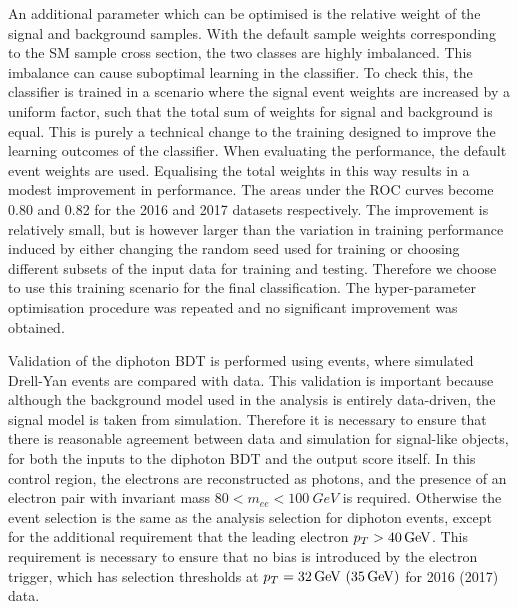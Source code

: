 An additional parameter which can be optimised is the relative weight 
of the signal and background samples.
With the default sample weights corresponding to the SM sample cross section, 
the two classes are highly imbalanced.
This imbalance can cause suboptimal learning in the classifier.
To check this, the classifier is trained in a scenario 
where the signal event weights are increased by a uniform factor, 
such that the total sum of weights for signal and background is equal.
This is purely a technical change to the training 
designed to improve the learning outcomes of the classifier.
When evaluating the performance, the default event weights are used.
Equalising the total weights in this way results in a modest improvement in performance.
The areas under the ROC curves become 0.80 and 0.82 for the 2016 and 2017 datasets respectively.
The improvement is relatively small, 
but is however larger than the variation 
in training performance induced by either changing the random seed used for training or 
choosing different subsets of the input data for training and testing.
Therefore we choose to use this training scenario for the final classification.
The hyper-parameter optimisation procedure was repeated 
and no significant improvement was obtained.


Validation of the diphoton BDT is performed using \Zee events, 
where simulated Drell-Yan events are compared with data.
This validation is important because although the background model used in the analysis 
is entirely data-driven, the signal model is taken from simulation.
Therefore it is necessary to ensure that there is reasonable agreement 
between data and simulation for signal-like objects,
for both the inputs to the diphoton BDT and the output score itself.
In this \Zee control region, the electrons are reconstructed as photons, 
and the presence of an electron pair with invariant mass $80 < m_{ee} < \SI{100}{GeV}$ is required.
Otherwise the event selection is the same as the analysis selection for diphoton events, 
except for the additional requirement that the leading electron $p_T > \SI{40}{GeV}$.
This requirement is necessary to ensure that no bias is introduced by the electron trigger, 
which has selection thresholds at $p_T = \SI{32}{GeV}~(\SI{35}{GeV})$ for 2016 (2017) data.

